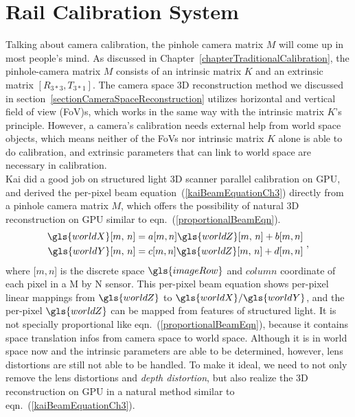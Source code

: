 \section{Rail Calibration System}
\label{sectionRailCalibrationSystem}
Talking about camera calibration, the pinhole camera matrix \(M\) will come up in most people's mind. As discussed in Chapter~\ref{chapterTraditionalCalibration}, the pinhole-camera matrix \(M\) consists of an intrinsic matrix \(K\) and an extrinsic matrix \([R_{3*3}, T_{3*1}]\). The camera space \gls{3D} reconstruction method we discussed in section~\ref{sectionCameraSpaceReconstruction} utilizes horizontal and vertical field of view (\gls{FoV})s, which works in the same way with the intrinsic matrix \(K\)'s principle. However, a camera's calibration needs external help from world space objects, which means neither of the FoVs nor intrinsic matrix \(K\) alone is able to do calibration,  and extrinsic parameters that can link to world space are necessary in calibration. 
\\\indent
Kai \cite{Kai10} did a good job on structured light \gls{3D} scanner parallel calibration on \gls{GPU}, and derived the per-pixel beam equation~(\ref{kaiBeamEquationCh3}) directly from a pinhole camera matrix \(M\), which offers the possibility of natural \gls{3D} reconstruction on \gls{GPU} similar to eqn.~(\ref{proportionalBeamEqn}).
%
\begin{equation}
\begin{aligned}
\gls{worldX}[m,\,  n] = a[m, n]\gls{worldZ}[m,\,  n]+b[m, n]
\\%
\gls{worldY}[m,\,  n] = c[m, n]\gls{worldZ}[m,\,  n]+d[m, n]
\end{aligned} \ ,
\label{kaiBeamEquationCh3}
\end{equation}%
\noindent
where [\(m,n\)] is the discrete space \(\gls{imageRow}\) and \(column\) coordinate of each pixel in a M by N sensor. This per-pixel beam equation shows per-pixel linear mappings from \(\gls{worldZ}\) to \(\gls{worldX}/\gls{worldY}\), and the per-pixel \(\gls{worldZ}\) can be mapped from features of structured light. It is not specially proportional like eqn.~(\ref{proportionalBeamEqn}), because it contains space translation infos from camera space to world space. Although it is in world space now and the intrinsic parameters are able to be determined, however, lens distortions are still not able to be handled. To make it ideal, we need to not only remove the lens distortions and \emph{depth distortion}, but also realize the \gls{3D} reconstruction on \gls{GPU} in a natural method similar to eqn.~(\ref{kaiBeamEquationCh3}).
